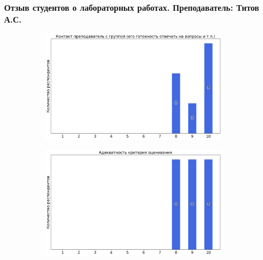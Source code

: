     \subsubsection{Отзыв студентов о лабораторных работах. Преподаватель: Титов А.С.}
        \begin{figure}[H]
            \centering
            \begin{subfigure}[b]{0.45\textwidth}
                \centering
                \includegraphics[width=\textwidth]{images/1 course/Общая физика - механика/labniks-marks-Титов А.С.-0.png}
            \end{subfigure}
            \begin{subfigure}[b]{0.45\textwidth}
                \centering
                \includegraphics[width=\textwidth]{images/1 course/Общая физика - механика/labniks-marks-Титов А.С.-1.png}
            \end{subfigure}
            \begin{subfigure}[b]{0.45\textwidth}
                \centering

\end{subfigure}
\end{figure}
